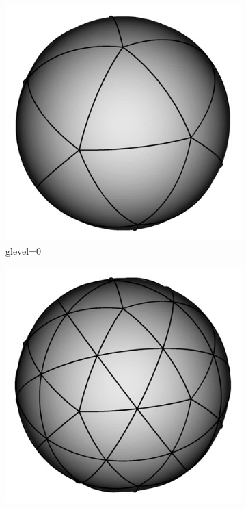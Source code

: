 \begin{figure}[tb]
\centering
\begin{subfigure}{.32\textwidth}
\centering
 \includegraphics[width=\textwidth]{figs/Tomita_etal_2008_SIAM-7-0.png}
\caption{glevel=0}\label{f:glevel_0}
\end{subfigure}
\begin{subfigure}{.32\textwidth}
\centering
 \includegraphics[width=\textwidth]{figs/Tomita_etal_2008_SIAM-7-1.png}

\end{subfigure}
\end{figure}
